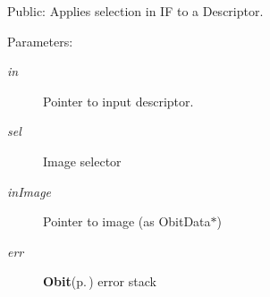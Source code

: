 Public: Applies selection in IF to a Descriptor. 

\begin{Desc}
\item[Parameters:]
\begin{description}
\item[{\em in}]Pointer to input descriptor. \item[{\em sel}]Image selector \item[{\em in\-Image}]Pointer to image (as Obit\-Data$\ast$) \item[{\em err}]{\bf Obit}{\rm (p.\,\pageref{structObit})} error stack \end{description}
\end{Desc}
